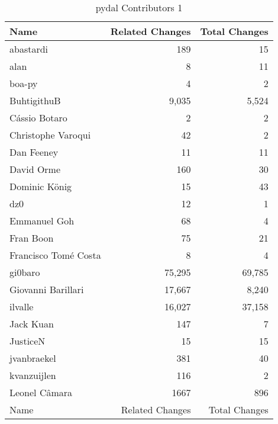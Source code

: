 \documentclass[a4paper,man,natbib,floatsintext]{apa6}
\begin{document}
\begin{table}[ht]
\caption{pydal Contributors 1}
\label{tab:contribs-2.1}
\begin{tabular}{|l|r|r|}
\hline
Name                 & Related Changes & Total Changes \\ \hline
abastardi            & 189             & 15            \\ \hline
alan                 & 8               & 11            \\ \hline
boa-py               & 4               & 2             \\ \hline
BuhtigithuB          & 9,035           & 5,524         \\ \hline
Cássio Botaro        & 2               & 2             \\ \hline
Christophe Varoqui   & 42              & 2             \\ \hline
Dan Feeney           & 11              & 11            \\ \hline
David Orme           & 160             & 30            \\ \hline
Dominic König        & 15              & 43            \\ \hline
dz0                  & 12              & 1             \\ \hline
Emmanuel Goh         & 68              & 4             \\ \hline
Fran Boon            & 75              & 21            \\ \hline
Francisco Tomé Costa & 8               & 4             \\ \hline
gi0baro              & 75,295          & 69,785        \\ \hline
Giovanni Barillari   & 17,667          & 8,240         \\ \hline
ilvalle              & 16,027          & 37,158        \\ \hline
Jack Kuan            & 147             & 7             \\ \hline
JusticeN             & 15              & 15            \\ \hline
jvanbraekel          & 381             & 40            \\ \hline
kvanzuijlen          & 116             & 2             \\ \hline
Leonel Câmara        & 1667            & 896           \\ \hline
Name                 & Related Changes & Total Changes \\ \hline
\end{tabular}
\end{table}
\end{document}
